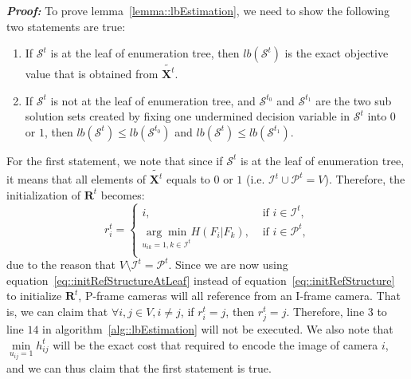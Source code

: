 \textbf{\emph{Proof:}}
To prove lemma~\ref{lemma::lbEstimation}, we need to show the following two statements are true:
\begin{enumerate}
\item If $\mathcal{S}^t$ is at the leaf of enumeration tree, then $lb(\mathcal{S}^t)$ is the exact objective value that is obtained from $\tilde{\mathbf{X}^t}$.
\item If $\mathcal{S}^t$ is not at the leaf of enumeration tree, and $\mathcal{S}^{t_0}$ and $\mathcal{S}^{t_1}$ are the two sub solution sets created by fixing one undermined decision variable in $\mathcal{S}^t$ into $0$ or $1$, then $lb(\mathcal{S}^t) \leq lb(\mathcal{S}^{t_0})$ and $lb(\mathcal{S}^t) \leq lb(\mathcal{S}^{t_1})$.
\end{enumerate}
For the first statement, we note that since if $\mathcal{S}^t$ is at the leaf of enumeration tree, it means that all elements of $\tilde{\mathbf{X}^t}$ equals to $0$ or $1$ (i.e. $\mathcal{I}^t \cup \mathcal{P}^t = V$).
Therefore, the initialization of $\mathbf{R}^t$ becomes:
\begin{equation}
r_i^t = 
\left\{ \begin{array}{cc}
i,  &\text{ if $i \in \mathcal{I}^t$,} \\                  	   
\underset{u_{ik}=1, k \in \mathcal{I}^t}{\arg\min} H(F_i|F_k),  &\text{ if $i \in \mathcal{P}^t$,} \\
\end{array} \right.
\label{eq::initRefStructureAtLeaf}
\end{equation}
due to the reason that $V \setminus \mathcal{I}^t = \mathcal{P}^t$.
Since we are now using equation~\eqref{eq::initRefStructureAtLeaf} instead of equation~\eqref{eq::initRefStructure} to initialize $\mathbf{R}^t$, P-frame cameras will all reference from an I-frame camera.
That is, we can claim that $\forall i,j \in V, i \neq j$, if $r_i^t = j$, then $r_j^t = j$.
Therefore, line $3$ to line $14$ in algorithm~\ref{alg::lbEstimation} will not be executed.
We also note that $\underset{u_{ij}=1}{\min} h_{ij}^t$ will be the exact cost that required to encode the image of camera $i$, and we can thus claim that the first statement is true.


